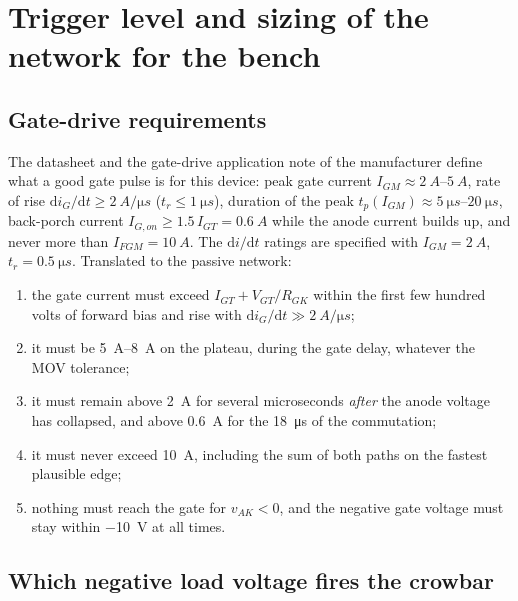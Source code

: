 \documentclass[11pt,a4paper]{article}
\begin{document}
\section{Trigger level and sizing of the network for the bench}
\label{sec:sizing}

\subsection{Gate-drive requirements}

The datasheet and the gate-drive application note of the manufacturer
\cite{ds26n6500,an5sya2034} define what a good gate pulse is for this device:
peak gate current $I_{GM} \approx \SIrange{2}{5}{A}$, rate of rise
$\mathrm{d}i_G/\mathrm{d}t \ge \SI{2}{A/\micro s}$ ($t_r \le \SI{1}{\micro s}$), duration of the
peak $t_p(I_{GM}) \approx \SIrange{5}{20}{\micro s}$, back-porch current $I_{G,on} \ge 1.5\,I_{GT}
= \SI{0.6}{A}$ while the anode current builds up, and never more than $I_{FGM} = \SI{10}{A}$. The
$\mathrm{d}i/\mathrm{d}t$ ratings are specified with $I_{GM} = \SI{2}{A}$, $t_r = \SI{0.5}{\micro s}$.
Translated to the passive network:
\begin{enumerate}
\item the gate current must exceed $I_{GT} + V_{GT}/R_{GK}$ within the first few hundred volts
      of forward bias and rise with $\mathrm{d}i_G/\mathrm{d}t \gg \SI{2}{A/\micro s}$;
\item it must be \SIrange{5}{8}{A} on the plateau, during the gate delay, whatever the MOV
      tolerance;
\item it must remain above \SI{2}{A} for several microseconds \emph{after} the anode voltage
      has collapsed, and above \SI{0.6}{A} for the \SI{18}{\micro s} of the commutation;
\item it must never exceed \SI{10}{A}, including the sum of both paths on the fastest plausible
      edge;
\item nothing must reach the gate for $v_{AK} < 0$, and the negative gate voltage must stay
      within \SI{-10}{V} at all times.
\end{enumerate}

\subsection{Which negative load voltage fires the crowbar}
\label{sec:level}
\end{document}
